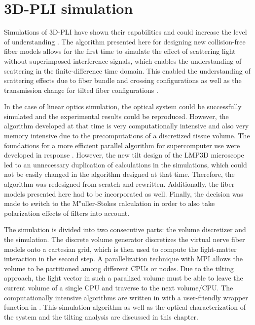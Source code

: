 \cleardoublepage
\setcounter{chapter}{4}
\chapter{\acs{3D-PLI} simulation}
\label{cha:sof:simulation}
%
Simulations of \ac{3D-PLI} have shown their capabilities and could increase the level of understanding \cite{Dohmen2015,Menzel2015,Menzel2016,Menzel2020,Menzel2021,MenzelMaster,MenzelDissertation}.
The algorithm presented here for designing new collision-free fiber models allows for the first time to simulate the effect of scattering light without superimposed interference signals, which enables the understanding of scattering in the finite-difference time domain.
This enabled the understanding of scattering effects due to fiber bundle and crossing configurations as well as the transmission change for tilted fiber configurations \cite{MenzelDissertation,Menzel2020,Menzel2021}.
\par
% 
In the case of linear optics simulation, the optical system could be successfully simulated and the experimental results \cite{Dohmen2015,Menzel2016} could be reproduced.
However, the algorithm developed at that time is very computationally intensive and also very memory intensive due to the precomputations of a discretized tissue volume.
The foundations for a more efficient parallel algorithm for supercomputer use were developed in response \cite{Lucksch2016}.
However, the new tilt design of the LMP3D microscope led to an unnecessary duplication of calculations in the simulations, which could not be easily changed in the algorithm designed at that time.
Therefore, the algorithm was redesigned from scratch and rewritten.
Additionally, the fiber models presented here had to be incorporated as well.
Finally, the decision was made to switch to the M"{u}ller-Stokes calculation in order to also take polarization effects of filters into account.
\par
%
The simulation is divided into two consecutive parts: the volume discretizer and the simulation.
The discrete volume generator discretizes the virtual nerve fiber models onto a cartesian grid, which is then used to compute the light-matter interaction in the second step.
A parallelization technique with \ac{MPI} allows the volume to be partitioned among different \acp{CPU} or nodes.
Due to the tilting approach, the light vector in such a paralized volume must be able to leave the current volume of a single \ac{CPU} and traverse to the next volume/\ac{CPU}.
The computationally intensive algorithms are written in \cpp{} with a user-friendly wrapper function in \python{}.
This simulation algorithm as well as the optical characterization of the system and the tilting analysis are discussed in this chapter.
%
% 
% 
